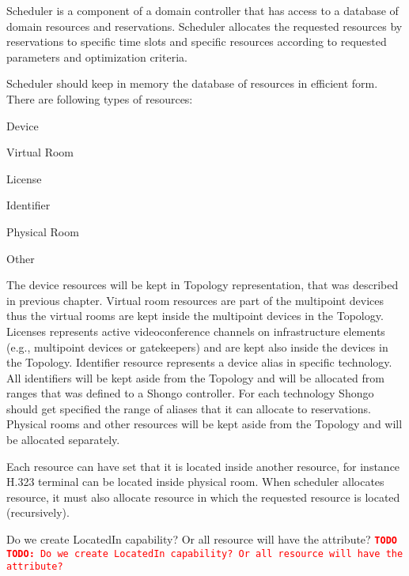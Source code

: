 \documentclass[a4paper]{report}
\newcommand{\TODO}[1]{%
\def\empty{}%
\def\prvniparametr{#1}%
\ifx\prvniparametr\empty%
\begingroup\tt\textcolor{red}{\noindent\textbf{TODO}}\endgroup
\else%
\begingroup\tt\textcolor{red}{\noindent\textbf{TODO:}\ #1}\endgroup
\fi%
}
\begin{document}
Scheduler is a component of a domain controller that has access to a database of domain resources and reservations. Scheduler allocates the requested resources by reservations to specific time slots and specific resources according to requested parameters and optimization criteria.

Scheduler should keep in memory the database of resources in efficient form. There are following types of resources:
\begin{compactitem}
\item Device
\item Virtual Room
\item License
\item Identifier
\item Physical Room
\item Other
\end{compactitem}
The device resources will be kept in Topology representation, that was described in previous chapter. Virtual room resources are part of the multipoint devices thus the virtual rooms are kept inside the multipoint devices in the Topology. Licenses represents active videoconference channels on infrastructure elements (e.g., multipoint devices or gatekeepers) and are kept also inside the devices in the Topology. Identifier resource represents a device alias in specific technology. All identifiers will be kept aside from the Topology and will be allocated from ranges that was defined to a Shongo controller. For each technology Shongo should get specified the range of aliases that it can allocate to reservations. Physical rooms and other resources will be kept aside from the Topology and will be allocated separately.

Each resource can have set that it is located inside another resource, for instance H.323 terminal can be located inside physical room. When scheduler allocates resource, it must also allocate resource in which the requested resource is located (recursively).

\TODO{Do we create LocatedIn capability? Or all resource will have the attribute?}
\end{document}
